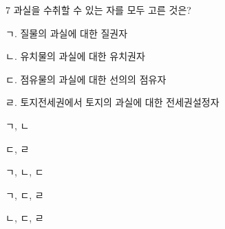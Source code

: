 \begin{question}{7}
과실을 수취할 수 있는 자를 모두 고른 것은?
\begin{framedtext}
ㄱ. 질물의 과실에 대한 질권자 \par
ㄴ. 유치물의 과실에 대한 유치권자 \par
ㄷ. 점유물의 과실에 대한 선의의 점유자 \par
ㄹ. 토지전세권에서 토지의 과실에 대한 전세권설정자 \par
\end{framedtext}
\begin{choices}
  \item ㄱ, ㄴ
  \item ㄷ, ㄹ
  \item ㄱ, ㄴ, ㄷ
  \item ㄱ, ㄷ, ㄹ
  \item ㄴ, ㄷ, ㄹ
\end{choices}
\end{question}
